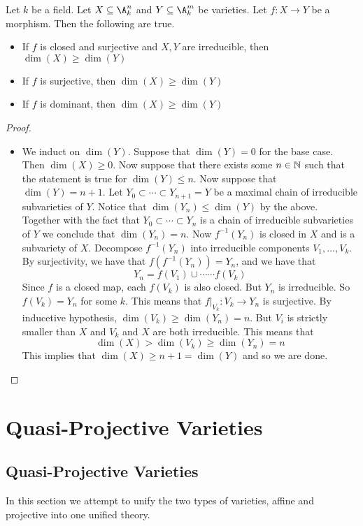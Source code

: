 \documentclass[a4paper]{article}
\begin{document}
\begin{prp}{}{} Let $k$ be a field. Let $X\subseteq\A_k^n$ and $Y\subseteq\A_k^m$ be varieties. Let $f:X\to Y$ be a morphism. Then the following are true. 
\begin{itemize}
\item If $f$ is closed and surjective and $X,Y$ are irreducible, then $\dim(X)\geq\dim(Y)$
\item If $f$ is surjective, then $\dim(X)\geq\dim(Y)$
\item If $f$ is dominant, then $\dim(X)\geq\dim(Y)$
\end{itemize} 
\begin{proof}~\\
\begin{itemize}
\item We induct on $\dim(Y)$. Suppose that $\dim(Y)=0$ for the base case. Then $\dim(X)\geq 0$. Now suppose that there exists some $n\in\mathbb{N}$ such that the statement is true for $\dim(Y)\leq n$. Now suppose that $\dim(Y)=n+1$. Let $Y_0\subset\cdots\subset Y_{n+1}=Y$ be a maximal chain of irreducible subvarieties of $Y$. Notice that $\dim(Y_n)\leq\dim(Y)$ by the above. Together with the fact that $Y_0\subset\cdots\subset Y_n$ is a chain of irreducible subvarieties of $Y$ we conclude that $\dim(Y_n)=n$. Now $f^{-1}(Y_n)$ is closed in $X$ and is a subvariety of $X$. Decompose $f^{-1}(Y_n)$ into irreducible components $V_1,\dots,V_k$. By surjectivity, we have that $f(f^{-1}(Y_n))=Y_n$, and we have that $$Y_n=f(V_1)\cup\cdots\cdots f(V_k)$$ Since $f$ is a closed map, each $f(V_k)$ is also closed. But $Y_n$ is irreducible. So $f(V_k)=Y_n$ for some $k$. This means that $f|_{V_k}:V_k\to Y_n$ is surjective. By inducetive hypothesis, $\dim(V_k)\geq\dim(Y_n)=n$. But $V_i$ is strictly smaller than $X$ and $V_k$ and $X$ are both irreducible. This means that $$\dim(X)>\dim(V_k)\geq\dim(Y_n)=n$$ This implies that $\dim(X)\geq n+1=\dim(Y)$ and so we are done. 
\end{itemize}
\end{proof}
\end{prp}

\pagebreak
\section{Quasi-Projective Varieties}
\subsection{Quasi-Projective Varieties}
In this section we attempt to unify the two types of varieties, affine and projective into one unified theory. 
\end{document}

